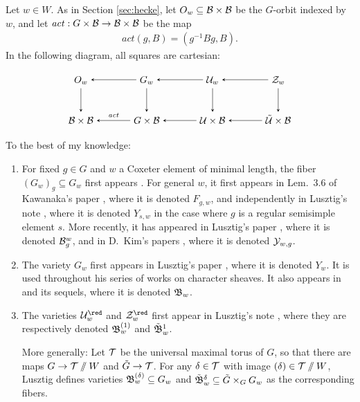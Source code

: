 \documentclass[a4paper,10pt,leqno]{amsart}
\theoremstyle{plain}
\theoremstyle{plain}
\theoremstyle{plain}
\theoremstyle{definition}
\theoremstyle{remark}
\newcommand{\act}{\mathit{act}}
\begin{document}
Let $w \in W$.
As in Section \ref{sec:hecke}, let $O_w \subseteq \cal{B} \times \cal{B}$ be the $G$-orbit indexed by $w$, and let $\act : G \times \cal{B} \to \cal{B} \times \cal{B}$ be the map
\begin{align}
\act(g, B) = (g^{-1}Bg, B).
\end{align}
In the following diagram, all squares are cartesian:
\begin{equation}
\begin{tikzpicture}[baseline=(current bounding box.center), >=stealth]
\matrix(m)[matrix of math nodes, row sep=2.5em, column sep=3.5em, text height=2ex, text depth=0.5ex]
{	O_w
		&G_w
		&\cal{U}_w
		&\cal{Z}_w\\
	\cal{B} \times \cal{B}
		&G \times \cal{B}
		&\cal{U} \times \cal{B}
		&\tilde{\cal{U}} \times \cal{B}\\
		};
\path[->,font=\scriptsize, auto]
(m-1-2)		edge (m-1-1)
(m-1-3) 	edge (m-1-2)
(m-1-4) 	edge (m-1-3)
(m-1-1)		edge (m-2-1)
(m-1-2)		edge (m-2-2)
(m-1-3) 	edge (m-2-3)
(m-1-4) 	edge (m-2-4)
(m-2-2)		edge node[above]{$\act$} (m-2-1)
(m-2-3)		edge (m-2-2)
(m-2-4)		edge (m-2-3);
\end{tikzpicture}
\end{equation}
To the best of my knowledge:
\begin{enumerate}
\item 	For fixed $g \in G$ and $w$ a Coxeter element of minimal length, the fiber $(G_w)_g \subseteq G_w$ first appears \cite[\S{4}]{steinberg_1965}.
		For general $w$, it first appears in Lem.\ 3.6 of Kawanaka's paper \cite{kawanaka}, where it is denoted $F_{g, w}$, and independently in Lusztig's note \cite{lusztig_1980}, where it is denoted $Y_{s, w}$ in the case where $g$ is a regular semisimple element $s$.
		More recently, it has appeared in Lusztig's paper \cite{lusztig_2011}, where it is denoted $\cal{B}_g^w$, and in D.\ Kim's papers \cite{kim_2018_algebra, kim_2018_imrn}, where it is denoted $\cal{Y}_{w, g}$.
		
\item 	The variety $G_w$ first appears in Lusztig's paper \cite{lusztig_1985_1}, where it is denoted $Y_w$.
		It is used throughout his series of works on character sheaves.
		It also appears in \cite{lusztig_2011} and its sequels, where it is denoted $\fr{B}_w$.
		
\item 	The varieties $\cal{U}_w^\red$ and $\cal{Z}_w^\red$ first appear in Lusztig's note \cite{lusztig_2021}, where they are respectively denoted $\fr{B}_w^{(1)}$ and $\tilde{\fr{B}}_w^1$.

		More generally:
		Let $\cal{T}$ be the universal maximal torus of $G$, so that there are maps $G \to \cal{T} \sslash W$ and $\tilde{G} \to \cal{T}$.
		For any $\delta \in \cal{T}$ with image $(\delta) \in \cal{T} \sslash W$, Lusztig defines varieties $\fr{B}_w^{(\delta)} \subseteq G_w$ and $\tilde{\fr{B}}_w^\delta \subseteq \tilde{G} \times_G G_w$ as the corresponding fibers.
\end{enumerate}
\end{document}
